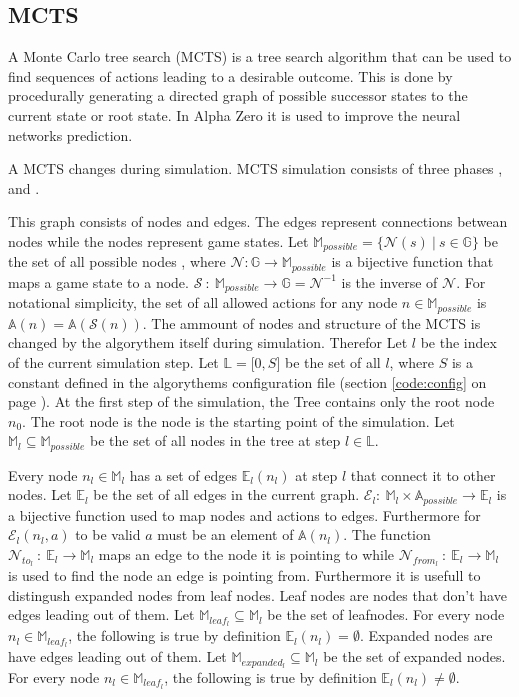 \documentclass[12pt]{article}
\newcommand{\sectionref}[1]{section \ref{#1} on page \pageref{#1}}
\begin{document}
\subsection{MCTS}
A Monte Carlo tree search (MCTS) is a tree search algorithm that can be used to find sequences of actions leading to a desirable outcome. This is done by procedurally generating a directed graph of possible successor states to the current state or root state. In Alpha Zero it is used to improve the neural networks prediction.

A MCTS changes during simulation. MCTS simulation consists of three phases ,  and .

This graph consists of nodes and edges. The edges represent connections betwean nodes while the nodes represent game states. Let \(\mathbb{M}_{possible} = \{\mathcal{N}(s)~|~ s \in \mathbb{G}\}\) be the set of all possible nodes , where \(\mathcal{N}:\mathbb{G}\to\mathbb{M}_{possible}\) is a bijective function that maps a game state to a node. \(\mathcal{S}~:~\mathbb{M}_{possible}\to\mathbb{G} = \mathcal{N}^{-1}\) is the inverse of \(\mathcal{N}\). For notational simplicity, the set of all allowed actions for any node \(n\in\mathbb{M}_{possible}\) is \(\mathbb{A}(n) = \mathbb{A}(\mathcal{S}(n))\). The ammount of nodes and structure of the MCTS is changed by the algorythem itself during simulation. Therefor Let \(l\) be the index of the current simulation step. Let \(\mathbb L = \mathbb [0, S]\) be the set of all \(l\), where \(S\) is a constant defined in the algorythems configuration file (\sectionref{code:config}). At the first step of the simulation, the Tree contains only the root node \(n_0\). The root node is the node is the starting point of the simulation. Let \(\mathbb{M}_l \subseteq \mathbb{M}_{possible}\) be the set of all nodes in the tree at step \(l\in\mathbb L\).

 Every node \(n_l \in \mathbb{M}_l\) has a set of edges \(\mathbb{E}_l(n_l)\) at step \(l\) that connect it to other nodes. Let \(\mathbb{E}_l\) be the set of all edges in the current graph. \(\mathcal{E}_l:~\mathbb{M}_l\times \mathbb{A}_{possible} \to \mathbb{E}_l\) is a bijective function used to map nodes and actions to edges. Furthermore for \(\mathcal{E}_l(n_l, a)\) to be valid \(a\) must be an element of \(\mathbb{A}(n_l)\).  The function \(\mathcal{N}_{to_l}~:~\mathbb{E}_{l}\to\mathbb{M}_l\) maps an edge to the node it is pointing to while \(\mathcal{N}_{from_l}~:~\mathbb{E}_{l}\to\mathbb{M}_l\) is used to find the node an edge is pointing from.
Furthermore it is usefull to distingush expanded nodes from leaf nodes. Leaf nodes are nodes that don't have edges leading out of them. Let \(\mathbb{M}_{leaf_l} \subseteq \mathbb{M}_l\) be the set of leafnodes. For every node \(n_l\in \mathbb{M}_{leaf_l}\), the following is true by definition \(\mathbb{E}_l(n_l) = \emptyset\). Expanded nodes are have edges leading out of them. Let \(\mathbb{M}_{expanded_l} \subseteq \mathbb{M}_l\) be the set of expanded nodes. For every node \(n_l\in \mathbb{M}_{leaf_l}\), the following is true by definition \(\mathbb{E}_l(n_l) \neq \emptyset\).
\end{document}
